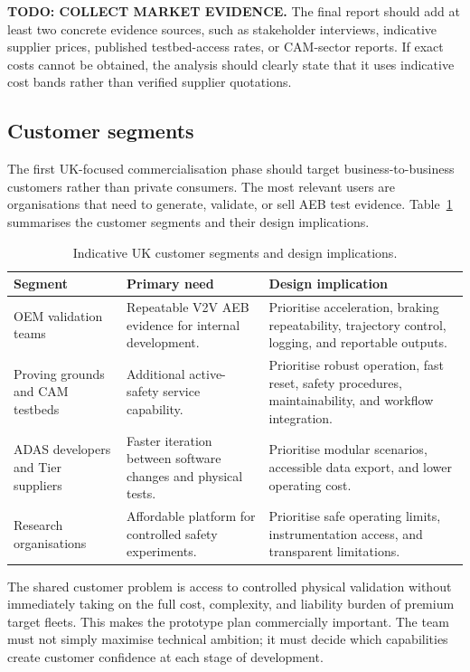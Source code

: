 \textbf{TODO: COLLECT MARKET EVIDENCE.} The final report should add at least two concrete evidence sources, such as stakeholder interviews, indicative supplier prices, published testbed-access rates, or CAM-sector reports. If exact costs cannot be obtained, the analysis should clearly state that it uses indicative cost bands rather than verified supplier quotations.

\subsection{Customer segments}

The first UK-focused commercialisation phase should target business-to-business customers rather than private consumers. The most relevant users are organisations that need to generate, validate, or sell AEB test evidence. Table~\ref{tab:customer_segments_compact} summarises the customer segments and their design implications.

\begin{table}[H]
\centering
\caption{Indicative UK customer segments and design implications.}
\label{tab:customer_segments_compact}
\begin{tabular}{p{} p{} p{}}
\toprule
\textbf{Segment} & \textbf{Primary need} & \textbf{Design implication} \\
\midrule
OEM validation teams & Repeatable V2V AEB evidence for internal development. & Prioritise acceleration, braking repeatability, trajectory control, logging, and reportable outputs. \\
\midrule
Proving grounds and CAM testbeds & Additional active-safety service capability. & Prioritise robust operation, fast reset, safety procedures, maintainability, and workflow integration. \\
\midrule
ADAS developers and Tier suppliers & Faster iteration between software changes and physical tests. & Prioritise modular scenarios, accessible data export, and lower operating cost. \\
\midrule
Research organisations & Affordable platform for controlled safety experiments. & Prioritise safe operating limits, instrumentation access, and transparent limitations. \\
\bottomrule
\end{tabular}
\end{table}

The shared customer problem is access to controlled physical validation without immediately taking on the full cost, complexity, and liability burden of premium target fleets. This makes the prototype plan commercially important. The team must not simply maximise technical ambition; it must decide which capabilities create customer confidence at each stage of development.

